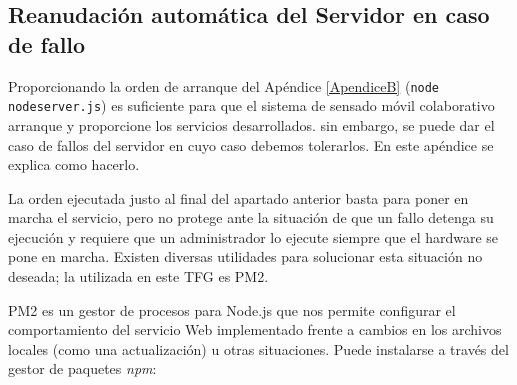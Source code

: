 \begin{appendices}


\cleardoublepage
{}%
\begin{center}
\begin{minipage}{.75\textwidth}

\section{Reanudación automática del Servidor en caso de fallo}\label{ApendiceC}

Proporcionando la orden de arranque del Apéndice \ref{ApendiceB} (\texttt{node nodeserver.js}) es suficiente para que el sistema de sensado móvil colaborativo arranque y proporcione los servicios desarrollados. sin embargo, se puede dar el caso de fallos del servidor en cuyo caso debemos tolerarlos. En este apéndice se explica como hacerlo.
\end{minipage}
\end{center}
\clearpage%

La orden ejecutada justo al final del apartado anterior basta para poner en marcha el servicio, pero no protege ante la situación de que un fallo detenga su ejecución y requiere que un administrador lo ejecute siempre que el hardware se pone en marcha. Existen diversas utilidades para solucionar esta situación no deseada; la utilizada en este TFG es PM2.

PM2 es un gestor de procesos para Node.js que nos permite configurar el comportamiento del servicio Web implementado frente a cambios en los archivos locales (como una actualización) u otras situaciones. Puede instalarse a través del gestor de paquetes \emph{npm}:



\end{appendices}
